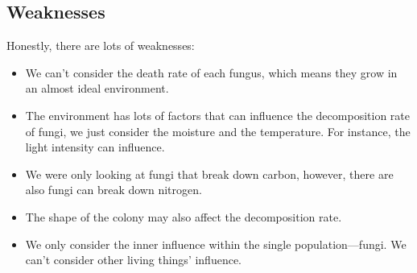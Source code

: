 \documentclass{mcmthesis}
\begin{document}
\subsection{Weaknesses}
Honestly, there are lots of weaknesses:
\begin{itemize}
  \item We can't consider the death rate of each fungus, which means they grow in an almost ideal environment.
  \item The environment has lots of factors that can influence the decomposition rate of fungi, we just consider the moisture and the temperature.
  For instance, the light intensity can influence.
  \item We were only looking at fungi that break down carbon, however, there are also fungi can break down nitrogen.
  \item The shape of the colony may also affect the decomposition rate.
  \item We only consider the inner influence within the single population---fungi. We can't consider other living things' influence.
\end{itemize}

\newpage



\newpage
\end{document}
